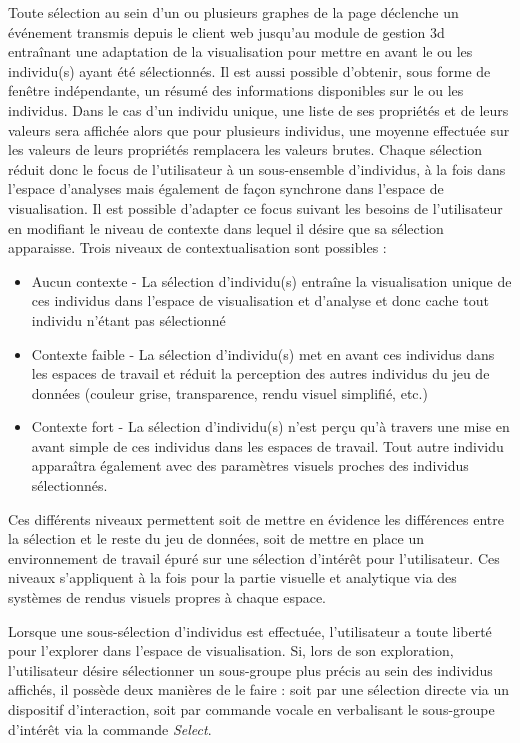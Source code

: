 Toute sélection au sein d'un ou plusieurs graphes de la page déclenche un événement transmis depuis le client web jusqu'au module de gestion 3d entraînant une adaptation de la visualisation pour mettre en avant le ou les individu(s) ayant été sélectionnés. Il est aussi possible d'obtenir, sous forme de fenêtre indépendante, un résumé des informations disponibles sur le ou les individus. Dans le cas d'un individu unique, une liste de ses propriétés et de leurs valeurs sera affichée alors que pour plusieurs individus, une moyenne effectuée sur les valeurs de leurs propriétés remplacera les valeurs brutes.
Chaque sélection réduit donc le focus de l'utilisateur à un sous-ensemble d'individus, à la fois dans l'espace d'analyses mais également de façon synchrone dans l'espace de visualisation. Il est possible d'adapter ce focus suivant les besoins de l'utilisateur en modifiant le niveau de contexte dans lequel il désire que sa sélection apparaisse. Trois niveaux de contextualisation sont possibles :
\begin{itemize}
  \item Aucun contexte - La sélection d'individu(s) entraîne la visualisation unique de ces individus dans l'espace de visualisation et d'analyse et donc cache tout individu n'étant pas sélectionné
  \item Contexte faible - La sélection d'individu(s) met en avant ces individus dans les espaces de travail et réduit la perception des autres individus du jeu de données (couleur grise, transparence, rendu visuel simplifié, etc.)
  \item Contexte fort - La sélection d'individu(s) n'est perçu qu'à travers une mise en avant simple de ces individus dans les espaces de travail. Tout autre individu apparaîtra également avec des paramètres visuels proches des individus sélectionnés.
\end{itemize}

Ces différents niveaux permettent soit de mettre en évidence les différences entre la sélection et le reste du jeu de données, soit de mettre en place un environnement de travail épuré sur une sélection d’intérêt pour l'utilisateur. Ces niveaux s'appliquent à la fois pour la partie visuelle et analytique via des systèmes de rendus visuels propres à chaque espace.

Lorsque une sous-sélection d'individus est effectuée, l'utilisateur a toute liberté pour l'explorer dans l'espace de visualisation. Si, lors de son exploration, l'utilisateur désire sélectionner un sous-groupe plus précis au sein des individus affichés, il possède deux manières de le faire : soit par une sélection directe via un dispositif d'interaction, soit par commande vocale en verbalisant le sous-groupe d’intérêt via la commande \textit{Select}.

